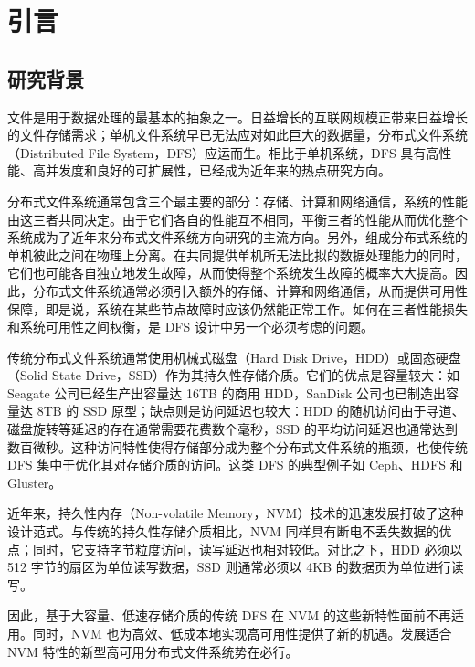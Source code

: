 
\chapter{引言}
\label{cha:intro}


\section{研究背景}
\label{sec:ch1_background}

文件是用于数据处理的最基本的抽象之一。日益增长的互联网规模正带来日益增长的文件存储需求；单机文件系统早已无法应对如此巨大的数据量，分布式文件系统（Distributed File System，DFS）应运而生。相比于单机系统，DFS 具有高性能、高并发度和良好的可扩展性，已经成为近年来的热点研究方向。

分布式文件系统通常包含三个最主要的部分：存储、计算和网络通信，系统的性能由这三者共同决定。由于它们各自的性能互不相同，平衡三者的性能从而优化整个系统成为了近年来分布式文件系统方向研究的主流方向。另外，组成分布式系统的单机彼此之间在物理上分离。在共同提供单机所无法比拟的数据处理能力的同时，它们也可能各自独立地发生故障，从而使得整个系统发生故障的概率大大提高。因此，分布式文件系统通常必须引入额外的存储、计算和网络通信，从而提供可用性保障，即是说，系统在某些节点故障时应该仍然能正常工作。如何在三者性能损失和系统可用性之间权衡，是 DFS 设计中另一个必须考虑的问题。

传统分布式文件系统通常使用机械式磁盘（Hard Disk Drive，HDD）或固态硬盘（Solid State Drive，SSD）作为其持久性存储介质。它们的优点是容量较大：如 Seagate 公司已经生产出容量达 16TB 的商用 HDD，SanDisk 公司也已制造出容量达 8TB 的 SSD 原型；缺点则是访问延迟也较大：HDD 的随机访问由于寻道、磁盘旋转等延迟的存在通常需要花费数个毫秒，SSD 的平均访问延迟也通常达到数百微秒。这种访问特性使得存储部分成为整个分布式文件系统的瓶颈，也使传统 DFS 集中于优化其对存储介质的访问。这类 DFS 的典型例子如 Ceph\cite{ceph2006}、HDFS\cite{hadoop2010} 和 Gluster\cite{gluster2013}。

近年来，持久性内存（Non-volatile Memory，NVM）技术的迅速发展打破了这种设计范式。与传统的持久性存储介质相比，NVM 同样具有断电不丢失数据的优点；同时，它支持字节粒度访问，读写延迟也相对较低。对比之下，HDD 必须以 512 字节的扇区为单位读写数据，SSD 则通常必须以 4KB 的数据页为单位进行读写。

因此，基于大容量、低速存储介质的传统 DFS 在 NVM 的这些新特性面前不再适用。同时，NVM 也为高效、低成本地实现高可用性提供了新的机遇。发展适合 NVM 特性的新型高可用分布式文件系统势在必行。


